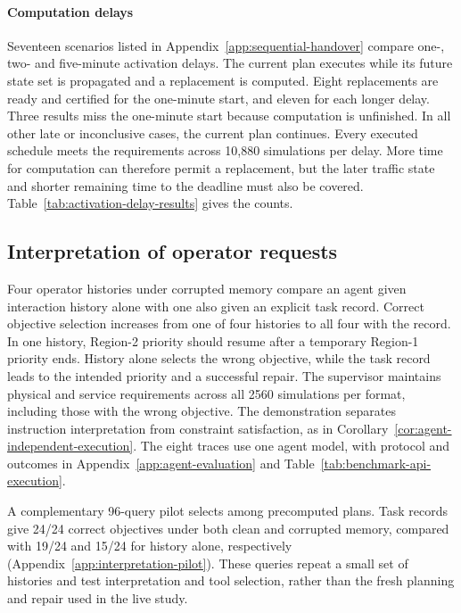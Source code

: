 \documentclass[final]{cas-sc}
\theoremstyle{definition}
\theoremstyle{plain}
\theoremstyle{definition}
\theoremstyle{plain}
\newcommand{\appref}[1]{Appendix~\ref{#1}}
\begin{document}
\paragraph{Computation delays}
\label{sec:delayed-handover-results}
Seventeen scenarios listed in \appref{app:sequential-handover} compare
one-, two- and five-minute activation delays. The current plan executes
while its future state set is propagated and a replacement is computed.
Eight replacements are ready and certified for the one-minute start,
and eleven for each longer delay. Three results miss the one-minute
start because computation is unfinished. In all other late or
inconclusive cases, the current plan continues. Every executed schedule
meets the requirements across 10,880 simulations per delay. More time
for computation can therefore permit a replacement, but the later
traffic state and shorter remaining time to the deadline must also be
covered. Table~\ref{tab:activation-delay-results} gives the counts.

\subsection{Interpretation of operator requests}
\label{sec:task-state-live}
Four operator histories under corrupted memory compare an agent given
interaction history alone with one also given an explicit task record.
Correct objective selection increases from one of four histories to
all four with the record. In one history, Region-2 priority should
resume after a temporary Region-1 priority ends. History alone selects
the wrong objective, while the task record leads to the intended
priority and a successful repair. The supervisor maintains physical
and service requirements across all 2560 simulations per format,
including those with the wrong objective. The demonstration separates
instruction interpretation from constraint satisfaction, as in
Corollary~\ref{cor:agent-independent-execution}. The eight traces use
one agent model, with protocol and outcomes in
\appref{app:agent-evaluation} and Table~\ref{tab:benchmark-api-execution}.

A complementary 96-query pilot selects among precomputed plans.
Task records give 24/24 correct objectives under both clean and
corrupted memory, compared with 19/24 and 15/24 for history alone,
respectively (\appref{app:interpretation-pilot}). These queries repeat
a small set of histories and test interpretation and tool selection,
rather than the fresh planning and repair used in the live study.
\end{document}
